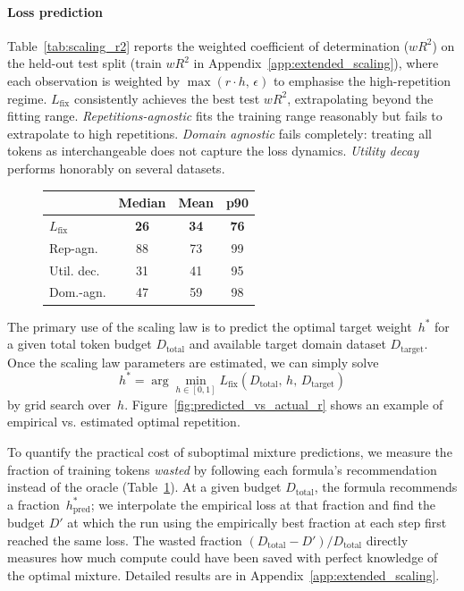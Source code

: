 \paragraph{Loss prediction}
Table~\ref{tab:scaling_r2} reports the weighted coefficient of determination ($wR^2$) on the held-out test split (train $wR^2$ in Appendix~\ref{app:extended_scaling}), where each observation is weighted by $\max(r \cdot h,\, \epsilon)$ to emphasise the high-repetition regime.
$L_\mathrm{fix}$ consistently achieves the best test $wR^2$, extrapolating beyond the fitting range.
\emph{Repetitions-agnostic} fits the training range reasonably but fails to extrapolate to high repetitions. \emph{Domain agnostic} fails completely: treating all tokens as interchangeable does not capture the loss dynamics.
\emph{Utility decay} performs honorably on several datasets.

\begin{figure}
\vspace{-10pt}
\centering
\footnotesize
\setlength{\tabcolsep}{4pt}
\begin{tabular}{lccc}
\toprule
& Median & Mean & p90 \\
\midrule
$L_\mathrm{fix}$ & \textbf{26} & \textbf{34} & \textbf{76} \\
Rep-agn. & 88 & 73 & 99 \\
Util. dec. & 31 & 41 & 95 \\
Dom.-agn. & 47 & 59 & 98 \\
\bottomrule
\end{tabular}
\label{tab:scaling_weight}
\vspace{-10pt}
\end{figure}
The primary use of the scaling law is to predict the optimal target weight~$h^*$ for a given total token budget $D_\text{total}$ and available target domain dataset $D_\text{target}$.
Once the scaling law parameters are estimated, we can simply solve
\begin{equation}\label{eq:hstar}
  h^* = \arg\min_{h \in [0,1]} L_\mathrm{fix}(D_\text{total},\, h,\, D_\text{target})
\end{equation}
by grid search over~$h$. Figure~\ref{fig:predicted_vs_actual_r} shows an example of empirical vs. estimated optimal repetition.

To quantify the practical cost of suboptimal mixture predictions, we measure the fraction of training tokens \emph{wasted} by following each formula's recommendation instead of the oracle (Table~\ref{tab:scaling_weight}).
At a given budget $D_\text{total}$, the formula recommends a fraction~$h^*_\text{pred}$; we interpolate the empirical loss at that fraction and find the budget $D'$ at which the run using the empirically best fraction at each step first reached the same loss.
The wasted fraction $(D_\text{total} - D') / D_\text{total}$ directly measures how much compute could have been saved with perfect knowledge of the optimal mixture.
Detailed results are in Appendix~\ref{app:extended_scaling}.
